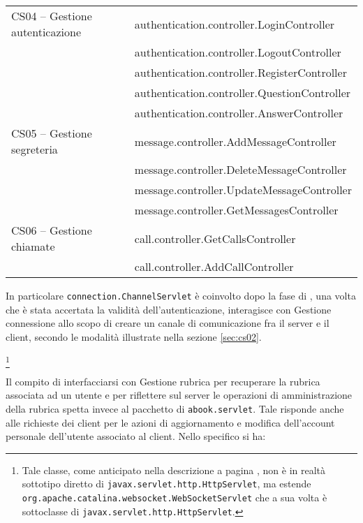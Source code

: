 \begin{description}
\begin{center}
\begin{tabular}{>{\sffamily}l>{\ttfamily}p{}}
CS04 -- Gestione autenticazione 


& authentication.controller.LoginController\\
& authentication.controller.LogoutController\\
& authentication.controller.RegisterController\\
& authentication.controller.QuestionController\\
& authentication.controller.AnswerController\\



CS05 -- Gestione segreteria 

& message.controller.AddMessageController\\
& message.controller.DeleteMessageController\\
& message.controller.UpdateMessageController\\
& message.controller.GetMessagesController\\



CS06 -- Gestione chiamate 

& call.controller.GetCallsController\\
& call.controller.AddCallController\\

\bottomrule
\end{tabular}
\end{center}

In particolare \texttt{connection.ChannelServlet} è coinvolto dopo la fase di , una volta che è stata accertata la validità dell'autenticazione, interagisce con \textsf{Gestione connessione} allo scopo di creare un canale di comunicazione fra il server e il client, secondo le modalità illustrate nella sezione \ref{sec:cs02}.




\footnote{%
Tale classe, come anticipato nella descrizione a pagina \pageref{sec:cs02}, non è in realtà sottotipo diretto di \texttt{javax.servlet.http.HttpServlet}, ma estende \texttt{org.apache.catalina.websocket.WebSocketServlet} che a sua volta è sottoclasse di \texttt{javax.servlet.http.HttpServlet}.
}

Il compito di interfacciarsi con \textsf{Gestione rubrica} per recuperare la rubrica associata ad un utente e per riflettere sul server le operazioni di amministrazione della rubrica spetta invece al pacchetto di  \texttt{abook.servlet}. Tale  risponde anche alle richieste dei client per le azioni di aggiornamento e modifica dell'account personale dell'utente associato al client. Nello specifico si ha:


\end{description}
